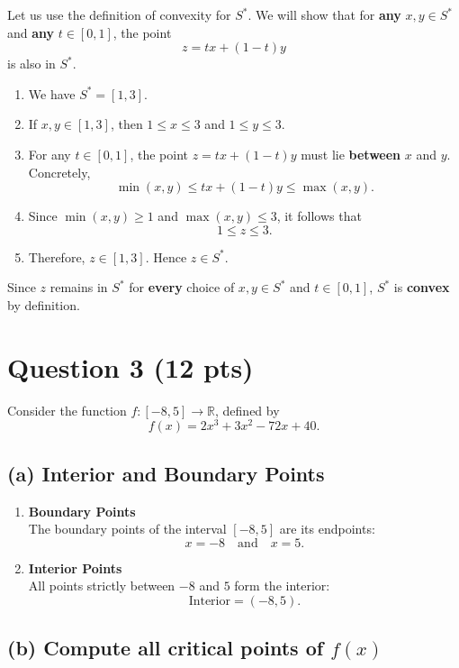 \documentclass[12pt]{article}
\begin{document}
Let us use the definition of convexity for \(S^*\). We will show that for \textbf{any} \(x, y \in S^*\) and \textbf{any} \(t \in [0,1]\), the point
\[
z = t x + (1 - t) y
\]
is also in \(S^*\).

\begin{enumerate}
    \item We have \(S^* = [1,3]\).
    \item If \(x, y \in [1,3]\), then \(1 \le x \le 3\) and \(1 \le y \le 3\).
    \item For any \(t \in [0,1]\), the point \(z = t x + (1-t) y\) must lie \textbf{between} \(x\) and \(y\). Concretely,
    \[
    \min(x,y) \le t x + (1-t) y \le \max(x,y).
    \]
    \item Since \(\min(x,y) \ge 1\) and \(\max(x,y) \le 3\), it follows that
    \[
    1 \le z \le 3.
    \]
    \item Therefore, \(z \in [1,3]\). Hence \(z \in S^*\).
\end{enumerate}

Since \(z\) remains in \(S^*\) for \textbf{every} choice of \(x, y \in S^*\) and \(t \in [0,1]\), \(S^*\) is \textbf{convex} by definition.

\bigskip
\newpage
\section*{Question 3 (12 pts)}

Consider the function \( f : [-8, 5] \to \mathbb{R} \), defined by
\[
f(x) = 2x^3 + 3x^2 - 72x + 40.
\]

\subsection*{(a) Interior and Boundary Points}

\begin{enumerate}
    \item \textbf{Boundary Points} \\
    The boundary points of the interval \([-8, 5]\) are its endpoints:
    \[
    \boxed{x = -8 \quad \text{and} \quad x = 5}.
    \]
    
    \item \textbf{Interior Points} \\
    All points strictly between \(-8\) and \(5\) form the interior:
    \[
    \boxed{\text{Interior} = (-8, 5)}.
    \]
\end{enumerate}
\newpage
\subsection*{(b) Compute all critical points of \( f(x) \)}
\end{document}
